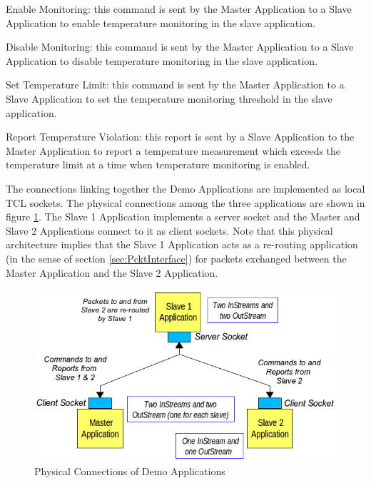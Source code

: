 \documentclass[a4paper,10pt]{article}
\newenvironment{fw_enumerate}					%
{\begin{enumerate}
  \setlength{\itemsep}{1mm}
  \setlength{\parskip}{0pt}
  \setlength{\parsep}{0pt}}
{\end{enumerate}}
\begin{document}
\begin{fw_enumerate}
\item Enable Monitoring: this command is sent by the Master Application to a Slave Application to enable temperature monitoring in the slave application.
\item Disable Monitoring: this command is sent by the Master Application to a Slave Application to disable temperature monitoring in the slave application.
\item Set Temperature Limit: this command is sent by the Master Application to a Slave Application to set the temperature monitoring threshold in the slave application.
\item Report Temperature Violation: this report is sent by a Slave Application to the Master Application to report a temperature measurement which exceeds the temperature limit at a time when temperature monitoring is enabled.
\end{fw_enumerate}

The connections linking together the Demo Applications are implemented as local TCL sockets. The physical connections among the three applications are shown in figure \ref{fig:DA_PhysicalLinks}. The Slave 1 Application implements a server socket and the Master and Slave 2 Applications connect to it as client sockets. Note that this physical architecture implies that the Slave 1 Application acts as a re-routing application (in the sense of section \ref{sec:PcktInterface}) for packets exchanged between the Master Application and the Slave 2 Application. 

\begin{figure}[H]
 \centering
 \includegraphics[scale=0.40,keepaspectratio=true]{DA_PhysicalLinks.png}
 \caption{Physical Connections of Demo Applications}
 \label{fig:DA_PhysicalLinks}
\end{figure}
\end{document}
